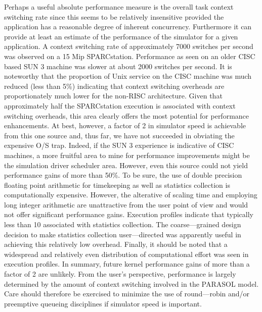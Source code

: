\documentclass[11pt]{article}
\begin{document}
Perhaps a useful absolute performance measure is the overall task context switching rate since this
seems to be relatively insensitive provided the application has a reasonable degree of inherent
concurrency. Furthermore it can provide at least an estimate of the performance of the simulator
for a given application. A context switching rate of approximately 7000 switches per second was
observed on a 15 Mip SPARCstation. Performance as seen on an older CISC based SUN 3
machine was slower at about 2000 switches per second. It is noteworthy that the proportion of
Unix service on the CISC machine was much reduced (less than 5\%) indicating that context
switching overheads are proportionately much lower for the non-RISC architecture. Given that
approximately half the SPARCstation execution is associated with context switching overheads,
this area clearly offers the most potential for performance enhancements. At best, however, a
factor of 2 in simulator speed is achievable from this one source and, thus far, we have not
succeeded in obviating the expensive O/S trap. Indeed, if the SUN 3 experience is indicative of
CISC machines, a more fruitful area to mine for performance improvements might be the
simulation driver scheduler area. However, even this source could not yield performance gains of
more than 50\%.
To be sure, the use of double precision floating point arithmetic for timekeeping as well as statistics
collection is computationally expensive. However, the alterative of scaling time and employing
long integer arithmetic are unattractive from the user point of view and would not offer significant
performance gains. Execution profiles indicate that typically less than 10%
associated with statistics collection. The coarse—grained design decision to make statistics
collection user—directed was apparently useful in achieving this relatively low overhead.
Finally, it should be noted that a widespread and relatively even distribution of computational effort
was seen in execution profiles. In summary, future kernel performance gains of more than a factor 
of 2 are unlikely. From the user's perspective, performance is largely determined by the amount of
context switching involved in the PARASOL model. Care should therefore be exercised to
minimize the use of round—robin and/or preemptive queueing disciplines if simulator speed is 
important.
\end{document}
